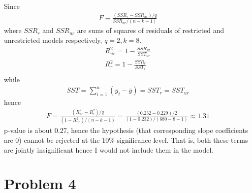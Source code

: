 \documentclass[a4paper]{article}
\newcommand{\summa}{\sum_{i=1}^n}
\begin{document}
\begin{enumerate}[(i)]
	
	Since 
	\begin{align*}
	F \equiv \frac{(SSR_r - SSR_{ur}) / q}{SSR_{ur}/(n - k - 1)}
	\end{align*}
	where $SSR_r$ and $SSR_{ur}$ are sums of squares of residuals of restricted and unrestricted models respectively, $q = 2, k = 8$. 
	\begin{align*}
	R^2_{ur} = 1 - \frac{SSR_{ur}}{SST_{ur}}\\
	R^2_{r} = 1 - \frac{SSR_{r}}{SST_{r}}\\
	\end{align*}
	while
	\begin{align*}
	SST = \summa (y_i - \bar{y}) = SST_r = SST_{ur}
	\end{align*}
	hence
	\begin{align*}
	F = \frac{(R^2_{ur} - R^2_r)/q}{(1 - R^2_{ur})/(n-k-1)} = \frac{(0.232 - 0.229)/2}{(1-0.232)/(680 - 8 - 1)} \approx 1.31
	\end{align*}
	p-value is about 0.27, hence the hypothesis (that corresponding slope coefficients are 0) cannot be rejected at the 10\% significance level. That is, both these terms are jointly insignificant hence I would not include them in the model.
\end{enumerate}
\section*{Problem 4}
\end{document}

